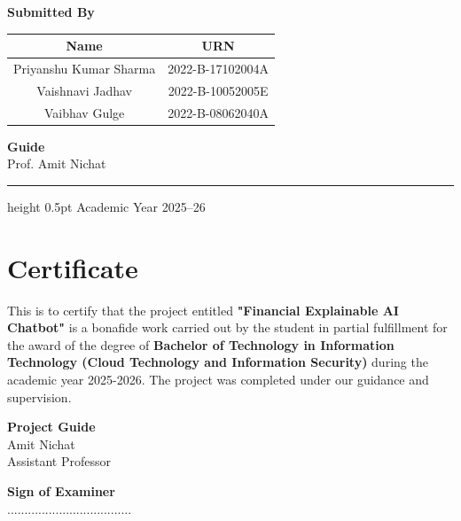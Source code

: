 \documentclass[12pt,a4paper]{report}
\begin{document}
\begin{titlepage}
\vspace{0.4cm}

{\large\bfseries Submitted By}\\[0.3cm]

\begin{tabular}{cc}
\hline
\rule{0pt}{12pt}\textbf{Name} & \textbf{URN} \\
\hline
\rule{0pt}{12pt}Priyanshu Kumar Sharma & 2022-B-17102004A \\
Vaishnavi Jadhav & 2022-B-10052005E \\
Vaibhav Gulge & 2022-B-08062040A\\
\hline
\end{tabular}

\vspace{0.4cm}

{\large\bfseries Guide}\\[0.15cm]
{\large Prof. Amit Nichat}

\vspace{0.4cm}
\color{accentblue}\hrule height 0.5pt
\color{black}
\vspace{0.2cm}
{\small Academic Year 2025--26}

\end{titlepage}
\thispagestyle{empty}

\chapter*{Certificate}
This is to certify that the project entitled \textbf{"Financial Explainable AI Chatbot"} is a bonafide work carried out by the student in partial fulfillment for the award of the degree of \textbf{Bachelor of Technology in Information Technology (Cloud Technology and Information Security)} during the academic year 2025-2026. The project was completed under our guidance and supervision.

\vspace{3cm}

\begin{flushleft}
    \textbf{Project Guide} \hfill  \\
    Amit Nichat \hfill  \\
    Assistant Professor \hfill 
\end{flushleft}

\vspace{2cm}
\begin{center}
    \textbf{Sign of Examiner} \\
    ....................................
\end{center}
\pagebreak
\end{document}
